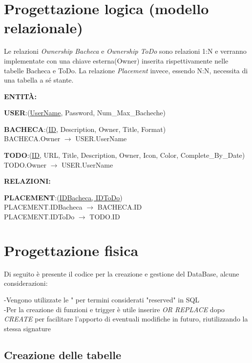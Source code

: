 \documentclass{article}
\begin{document}
		\pagebreak
		\section{Progettazione logica (modello relazionale)}
		Le relazioni \textit{Ownership Bacheca} e \textit{Ownership ToDo} sono relazioni 1:N e verranno implementate con una chiave esterna(Owner) inserita rispettivamente nelle tabelle Bacheca e ToDo.
		La relazione \textit{Placement} invece, essendo N:N, necessita di una tabella a sé stante. \linebreak[2]
		
		\textbf{ENTITÀ:}
		
		\textbf{USER}:(\underline{UserName}, Password, Num{\_}Max{\_}Bacheche) \linebreak[2]
		
		\textbf{BACHECA}:(\underline{ID}, Description, Owner, Title, Format) \\
		BACHECA.Owner $\rightarrow$ USER.UserName \linebreak[2]
		
		\textbf{TODO}:(\underline{ID}, URL, Title, Description, Owner, Icon, Color, Complete{\_}By{\_}Date) \\
		TODO.Owner $\rightarrow$ USER.UserName \linebreak[2]
		
		\textbf{RELAZIONI:}
		
		\textbf{PLACEMENT}:(\underline{IDBacheca, IDToDo}) \\
		PLACEMENT.IDBacheca $\rightarrow$ BACHECA.ID \\
		PLACEMENT.IDToDo $\rightarrow$ TODO.ID
		
		\pagebreak
		\section{Progettazione fisica}
		
		Di seguito è presente il codice per la creazione e gestione del DataBase, alcune considerazioni:
		
		-Vengono utilizzate le " per termini considerati "reserved" in SQL \\
		-Per la creazione di funzioni e trigger è utile inserire \textit{OR REPLACE} dopo \textit{CREATE} per facilitare l'apporto di eventuali modifiche in futuro, riutilizzando la stessa signature
		
		\subsection{Creazione delle tabelle}
		
\end{document}

